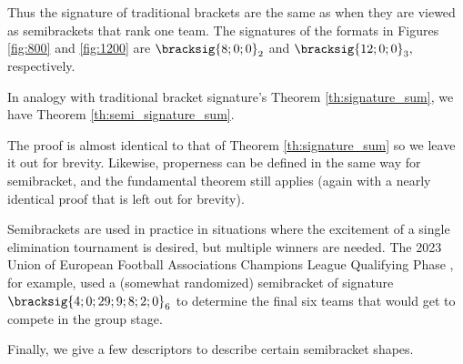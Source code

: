 {    

    Thus the signature of traditional brackets are the same as when they are viewed as semibrackets that rank one team. The signatures of the formats in Figures \ref{fig:800} and \ref{fig:1200} are $\bracksig{8;0;0}_2$ and $\bracksig{12;0;0}_3,$ respectively.

    In analogy with traditional bracket signature's Theorem \ref{th:signature_sum}, we have Theorem \ref{th:semi_signature_sum}.


    The proof is almost identical to that of Theorem \ref{th:signature_sum} so we leave it out for brevity. Likewise, properness can be defined in the same way for semibracket, and the fundamental theorem still applies (again with a nearly identical proof that is left out for brevity).


    Semibrackets are used in practice in situations where the excitement of a single elimination tournament is desired, but multiple winners are needed. The 2023 Union of European Football Associations Champions League Qualifying Phase \cite{wiki_uefa}, for example, used a (somewhat randomized) semibracket of signature $\bracksig{4;0;29;9;8;2;0}_6$ to determine the final six teams that would get to compete in the group stage.


    Finally, we give a few descriptors to describe certain semibracket shapes.



}
